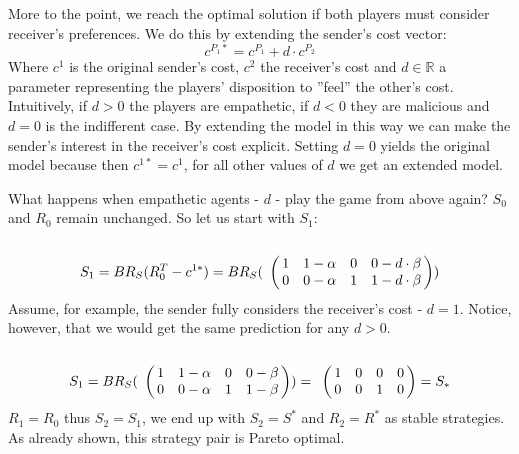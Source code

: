 \documentclass[10pt,a4paper]{article}
\begin{document}
More to the point, we reach the optimal solution if both players must consider receiver's preferences. We do this by extending the sender's cost vector:
$$c^{P_1*}=c^{P_1} + d \cdot c^{P_2}$$
Where $c^{1}$ is the original sender's cost, $c^{2}$ the receiver's cost and $d \in \mathbb{R}$ a parameter representing the players' disposition to ''feel'' the other's cost. Intuitively, if $d>0$ the players are empathetic, if $d<0$ they are malicious and $d=0$ is the indifferent case. By extending the model in this way we can make the sender's interest in the receiver's cost explicit. Setting $d=0$ yields the original model because then $c^{1*}=c^{1}$, for all other values of $d$ we get an extended model.

What happens when empathetic agents - $d$ - play the game from above again? $S_0$ and $R_0$ remain unchanged. So let us start with $S_1$:
\begin{equation*}
S_1= BR_S(R_0^T-c^{1*})=BR_S(
\bordermatrix{
                & & & &    \cr
     &       1 &         1-\alpha & 0       & 0-d\cdot \beta \cr
     &       0 &         0-\alpha & 1      & 1-d\cdot \beta
 }
)
\end{equation*}
Assume, for example, the sender fully considers the receiver's cost - $d=1$. Notice, however, that we would get the same prediction for any $d>0$.
\begin{equation*}
S_1=BR_S(
\bordermatrix{
                & & & &    \cr
     &       1 &         1-\alpha & 0       & 0-\beta \cr
     &       0 &         0-\alpha & 1      & 1-\beta
 }
 )
=
\bordermatrix{
                & & & &    \cr
     &       1 &         0 & 0       & 0 \cr
     &       0 &         0 & 1      & 0
 }
 =S_*
 \end{equation*}
$R_1=R_0$ thus $S_2=S_1$, we end up with $S_2=S^*$ and $R_2=R^*$ as stable strategies.
As already shown, this strategy pair is Pareto optimal.
\end{document}
